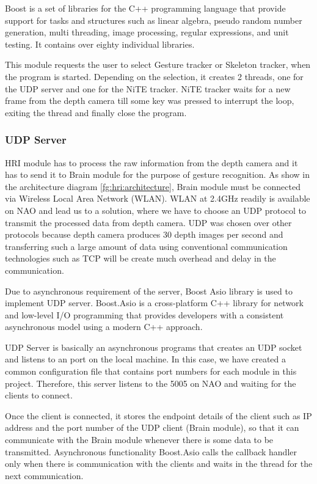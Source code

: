 Boost is a set of libraries for the C++ programming language that provide support for tasks and structures such as linear algebra, pseudo random number generation, multi threading, image processing, regular expressions, and unit testing. It contains over eighty individual libraries.

This module requests the user to select Gesture tracker or Skeleton tracker, when the program is started. Depending on the selection, it creates 2 threads, one for the UDP server and one for the NiTE tracker. NiTE tracker waits for a new frame from the depth camera till some key was pressed to interrupt the loop, exiting the thread and finally close the program. 

\subsubsection{UDP Server}
HRI module has to process the raw information from the depth camera and it has to send it to Brain module for the purpose of gesture recognition. As show in the architecture diagram \ref{fg:hri:architecture}, Brain module must be connected via Wireless Local Area Network (WLAN). WLAN at 2.4GHz readily is available on NAO and lead us to a solution, where we have to choose an UDP protocol to transmit the processed data from depth camera. UDP was chosen over other protocols because depth camera produces 30 depth images per second and transferring such a large amount of data using conventional communication technologies such as TCP will be create much overhead and delay in the communication.

Due to asynchronous requirement of the server, Boost Asio library is used to implement UDP server. Boost.Asio is a cross-platform C++ library for network and low-level I/O programming that provides developers with a consistent asynchronous model using a modern C++ approach.

UDP Server is basically an asynchronous programs that creates an UDP socket and listens to an port on the local machine. In this case, we have created a common configuration file that contains port numbers for each module in this project. Therefore, this server listens to the 5005 on NAO and waiting for the clients to connect. 

Once the client is connected, it stores the endpoint details of the client such as IP address and the port number of the UDP client (Brain module), so that it can communicate with the Brain module whenever there is some data to be transmitted. Asynchronous functionality Boost.Asio calls the callback handler only when there is communication with the clients and waits in the thread for the next communication.

